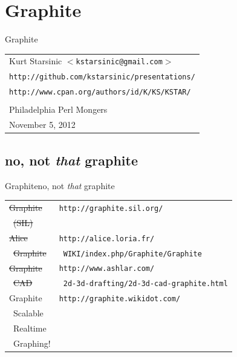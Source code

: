 \documentclass[smaller]{beamer} %
\begin{document}

\section{Graphite}
\begin{frame}{Graphite}
    \begin{tabular}{l}
        Kurt Starsinic {\tt $<$kstarsinic@gmail.com$>$} \\
        {\tt http://github.com/kstarsinic/presentations/} \\ %
        {\tt http://www.cpan.org/authors/id/K/KS/KSTAR/} \\
        \\
        Philadelphia Perl Mongers \\
        November 5, 2012 \\
    \end{tabular}
\end{frame}

\subsection{no, not {\it that} graphite}
\begin{frame}{Graphite}{no, not {\it that} graphite}
    \begin{tabular}{|l|l|}
        \hline
        \sout{Graphite}     & {\tt http://graphite.sil.org/}  \\
        \ \sout{(SIL)}      &                           \\ \hline

        \sout{Alice}        & {\tt http://alice.loria.fr/} \\
        \ \sout{Graphite}   & {\tt \ WIKI/index.php/Graphite/Graphite} \\ \hline

        \sout{Graphite}     & {\tt http://www.ashlar.com/} \\
        \ \sout{CAD}        & {\tt \ 2d-3d-drafting/2d-3d-cad-graphite.html} \\ \hline

        Graphite            & {\tt http://graphite.wikidot.com/} \\
        \ Scalable          & \\
        \ Realtime          & \\
        \ Graphing!         & \\ \hline
    \end{tabular}
\end{frame}
\end{document}
